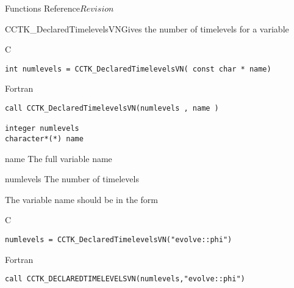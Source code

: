 \begin{cactuspart}{ Functions Reference}{}{$Revision$}
\begin{FunctionDescription}{CCTK\_DeclaredTimelevelsVN}{Gives the number of timelevels for a variable}
\label{CCTK-DeclaredTimelevelsVN}
\begin{SynopsisSection}
\begin{Synopsis}{C}
\begin{verbatim}int numlevels = CCTK_DeclaredTimelevelsVN( const char * name)\end{verbatim}
\end{Synopsis}
\begin{Synopsis}{Fortran}
\begin{verbatim}call CCTK_DeclaredTimelevelsVN(numlevels , name )

integer numlevels
character*(*) name\end{verbatim}
\end{Synopsis}
\end{SynopsisSection}
\begin{ParameterSection}
\begin{Parameter}{name}
The full variable name
\end{Parameter}
\begin{Parameter}{numlevels}
The number of timelevels
\end{Parameter}
\end{ParameterSection}
\begin{Discussion}
The variable name should be in the form 
\end{Discussion}
\begin{ExampleSection}
\begin{Example}{C}
\begin{verbatim}
numlevels = CCTK_DeclaredTimelevelsVN("evolve::phi")
\end{verbatim}
\end{Example}
\begin{Example}{Fortran}
\begin{verbatim}
call CCTK_DECLAREDTIMELEVELSVN(numlevels,"evolve::phi")
\end{verbatim}
\end{Example}
\end{ExampleSection}
\end{FunctionDescription}




\end{cactuspart}

